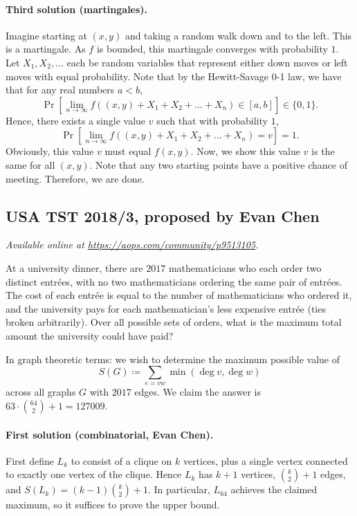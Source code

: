 \documentclass[11pt]{scrartcl}
\begin{document}
\paragraph{Third solution (martingales).}
Imagine starting at $(x, y)$
and taking a random walk down and to the left.
This is a martingale.
As $f$ is bounded, this martingale converges with probability $1$.
Let $X_1, X_2, \dots$ each be random variables
that represent either down moves or left moves with equal probability.
Note that by the Hewitt-Savage 0-1 law,
we have that for any real numbers $a < b$,
\[ \Pr\left[ \lim_{n \to \infty} f((x, y)+X_1+X_2+\dots + X_n)
  \in [a, b] \right] \in \{0,1\}. \]
Hence, there exists a single value $v$ such that with probability $1$,
\[ \Pr\left[\lim_{n \to \infty} f((x, y)+X_1+X_2+\dots + X_n)
  = v\right] = 1. \]
Obviously, this value $v$ must equal $f(x, y)$.
Now, we show this value $v$ is the same for all $(x, y)$.
Note that any two starting points have a positive chance of meeting.
Therefore, we are done.
\pagebreak

\subsection{USA TST 2018/3, proposed by Evan Chen}
\textsl{Available online at \url{https://aops.com/community/p9513105}.}
\begin{mdframed}[style=mdpurplebox,frametitle={Problem statement}]
At a university dinner,
there are $2017$ mathematicians who each order two distinct entr\'ees,
with no two mathematicians ordering the same pair of entr\'{e}es.
The cost of each entr\'ee is equal
to the number of mathematicians who ordered it,
and the university pays for each mathematician's
less expensive entr\'ee (ties broken arbitrarily).
Over all possible sets of orders,
what is the maximum total amount the university could have paid?
\end{mdframed}
In graph theoretic terms:
we wish to determine the maximum possible value of
\[ S(G) \coloneqq \sum_{e = vw} \min \left( \deg v, \deg w \right) \]
across all graphs $G$ with $2017$ edges.
We claim the answer is $63 \cdot \binom{64}{2} + 1 = 127009$.

\paragraph{First solution (combinatorial, Evan Chen).}
First define $L_k$ to consist of a clique on $k$ vertices,
plus a single vertex connected to exactly one vertex of the clique.
Hence $L_k$ has $k+1$ vertices, $\binom k2+1$ edges,
and $S(L_k) = (k-1) \binom k2 + 1$.
In particular, $L_{64}$ achieves the claimed maximum,
so it suffices to prove the upper bound.
\end{document}
